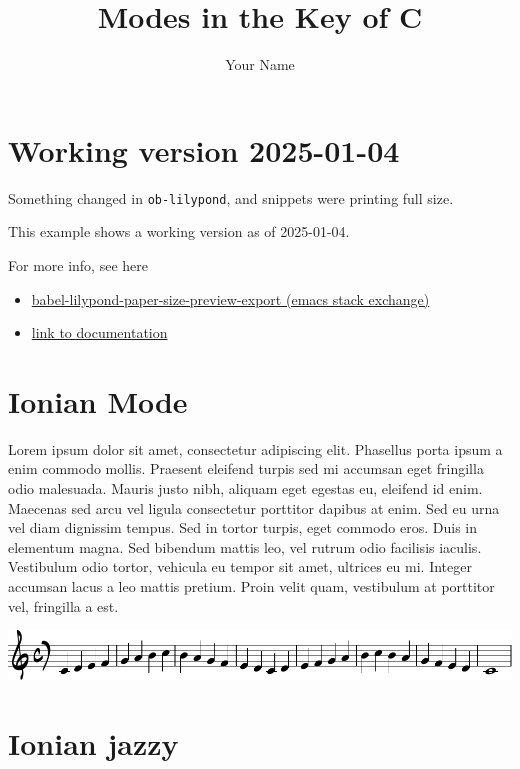 \documentclass[11pt]{article}
\author{Your Name}
\date{}
\title{Modes in the Key of C}
\let\maketitle\relax %
\begin{document}
\maketitle

\section*{Working version 2025-01-04}
\label{sec:orgce38c1a}

Something changed in \texttt{ob-lilypond}, and snippets were printing full size.

This example shows a working version as of 2025-01-04.

For more info, see here
\begin{itemize}
\item \href{https://emacs.stackexchange.com/questions/70551/babel-lilypond-paper-size-preview-export}{babel-lilypond-paper-size-preview-export (emacs stack exchange)}
\item \href{https://lilypond.org/doc/v2.24/Documentation/usage/other-programs}{link to documentation}
\end{itemize}

\section*{Ionian Mode}
\label{sec:org20d304a}

Lorem ipsum dolor sit amet, consectetur adipiscing elit. Phasellus
porta ipsum a enim commodo mollis. Praesent eleifend turpis sed mi
accumsan eget fringilla odio malesuada. Mauris justo nibh, aliquam
eget egestas eu, eleifend id enim. Maecenas sed arcu vel ligula
consectetur porttitor dapibus at enim. Sed eu urna vel diam dignissim
tempus. Sed in tortor turpis, eget commodo eros. Duis in elementum
magna. Sed bibendum mattis leo, vel rutrum odio facilisis iaculis.
Vestibulum odio tortor, vehicula eu tempor sit amet, ultrices eu mi.
Integer accumsan lacus a leo mattis pretium. Proin velit quam,
vestibulum at porttitor vel, fringilla a est.

\begin{center}
\includegraphics[width=.9\linewidth]{ionian.pdf}
\end{center}

\section*{Ionian jazzy}
\label{sec:org2a7825b}
\end{document}
